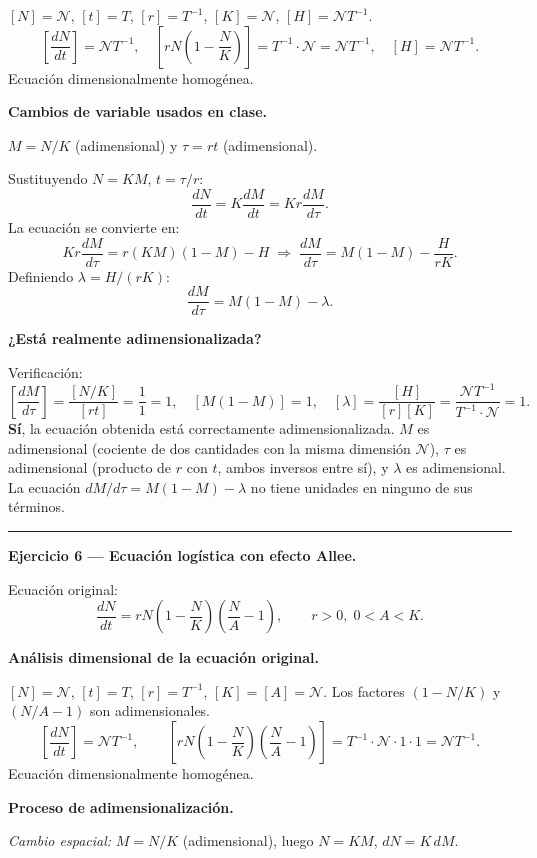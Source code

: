 \documentclass[12pt,letterpaper]{article}
\begin{document}
$[N]=\mathcal{N}$, $[t]=T$, $[r]=T^{-1}$, $[K]=\mathcal{N}$, $[H]=\mathcal{N}T^{-1}$.
\[
  \left[\frac{dN}{dt}\right]=\mathcal{N}T^{-1},\quad
  \left[rN\!\left(1-\frac{N}{K}\right)\right]=T^{-1}\cdot\mathcal{N}=\mathcal{N}T^{-1},\quad
  [H]=\mathcal{N}T^{-1}.
\]
Ecuación dimensionalmente homogénea. \checkmark

\textbf{Cambios de variable usados en clase.}

$M=N/K$ (adimensional) y $\tau=rt$ (adimensional).

Sustituyendo $N=KM$, $t=\tau/r$:
\[
  \frac{dN}{dt}=K\frac{dM}{dt}=Kr\frac{dM}{d\tau}.
\]
La ecuación se convierte en:
\[
  Kr\frac{dM}{d\tau}=r(KM)\!\left(1-M\right)-H
  \;\Longrightarrow\;
  \frac{dM}{d\tau}=M(1-M)-\frac{H}{rK}.
\]
Definiendo $\lambda=H/(rK)$:
\[
  \frac{dM}{d\tau}=M(1-M)-\lambda.
\]

\textbf{¿Está realmente adimensionalizada?}

Verificación:
\[
  \left[\frac{dM}{d\tau}\right]=\frac{[N/K]}{[rt]}=\frac{1}{1}=1,\quad
  [M(1-M)]=1,\quad
  [\lambda]=\frac{[H]}{[r][K]}=\frac{\mathcal{N}T^{-1}}{T^{-1}\cdot\mathcal{N}}=1.
\]
\textbf{Sí}, la ecuación obtenida está correctamente adimensionalizada.
$M$ es adimensional (cociente de dos cantidades con la misma dimensión $\mathcal{N}$),
$\tau$ es adimensional (producto de $r$ con $t$, ambos inversos entre sí),
y $\lambda$ es adimensional. La ecuación $dM/d\tau=M(1-M)-\lambda$ no tiene unidades
en ninguno de sus términos. \checkmark

\bigskip
\noindent\rule{\textwidth}{0.3pt}
\bigskip

\noindent\textbf{Ejercicio 6 — Ecuación logística con efecto Allee.}

Ecuación original:
\[
  \frac{dN}{dt}=rN\!\left(1-\frac{N}{K}\right)\!\left(\frac{N}{A}-1\right),
  \qquad r>0,\;0<A<K.
\]

\textbf{Análisis dimensional de la ecuación original.}

$[N]=\mathcal{N}$, $[t]=T$, $[r]=T^{-1}$, $[K]=[A]=\mathcal{N}$.
Los factores $(1-N/K)$ y $(N/A-1)$ son adimensionales.
\[
  \left[\frac{dN}{dt}\right]=\mathcal{N}T^{-1},\qquad
  \left[rN\!\left(1-\frac{N}{K}\right)\!\left(\frac{N}{A}-1\right)\right]=
  T^{-1}\cdot\mathcal{N}\cdot 1\cdot 1=\mathcal{N}T^{-1}.
\]
Ecuación dimensionalmente homogénea. \checkmark

\textbf{Proceso de adimensionalización.}

\emph{Cambio espacial:} $M=N/K$ (adimensional), luego $N=KM$, $dN=K\,dM$.
\end{document}
